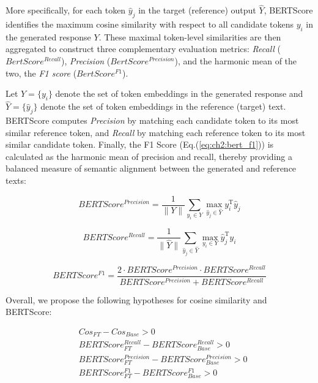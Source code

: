 More specifically, for each token $\hat{y}_j$ in the target (reference) output $\hat{Y}$, BERTScore identifies the maximum cosine similarity with respect to all candidate tokens $y_i$ in the generated response $Y$. These maximal token-level similarities are then aggregated to construct three complementary evaluation metrics: \textit{Recall} ($BertScore^{Recall}$), \textit{Precision} ($BertScore^{Precision}$), and the harmonic mean of the two, the \textit{F1 score} ($BertScore^{F1}$).


Let $Y=\{y_i\}$ denote the set of token embeddings in the generated response and $\hat{Y}=\{\hat{y}_j\}$ denote the set of token embeddings in the reference (target) text. BERTScore computes \textit{Precision} by matching each candidate token to its most similar reference token, and \textit{Recall} by matching each reference token to its most similar candidate token. Finally, the F1 Score (Eq.(\ref{eq:ch2:bert_f1})) is calculated as the harmonic mean of precision and recall, thereby providing a balanced measure of semantic alignment between the generated and reference texts:

\begin{equation}\label{eq:ch2:bert_precision}
    BERTScore^{Precision} = \frac{1}{\|Y\|}\sum_{y_i \in Y} \max_{\hat{y}_j \in \hat{Y}} y_i^{\text{T}}\hat{y}_j
\end{equation}

\begin{equation}\label{eq:ch2:bert_recall}
    BERTScore^{Recall} = \frac{1}{\|\hat{Y}\|}\sum_{\hat{y}_j \in \hat{Y}} \max_{y_i \in Y} \hat{y}_j^{\text{T}}y_i
\end{equation}

\begin{equation}\label{eq:ch2:bert_f1}
    BERTScore^{F1} = \frac{2\cdot BERTScore^{Precision}\cdot BERTScore^{Recall}}{BERTScore^{Precision}+BERTScore^{Recall}}
\end{equation}


Overall, we propose the following hypotheses for cosine similarity and BERTScore:

\begin{equation*}
    \begin{split}
        &Cos_{FT} - Cos_{Base} > 0 \\
        &BERTScore^{Recall}_{FT} - BERTScore^{Recall}_{Base} > 0 \\
        &BERTScore^{Precision}_{FT} - BERTScore^{Precision}_{Base} > 0\\
        &BERTScore^{F1}_{FT} - BERTScore^{F1}_{Base} > 0
    \end{split}
\end{equation*}


